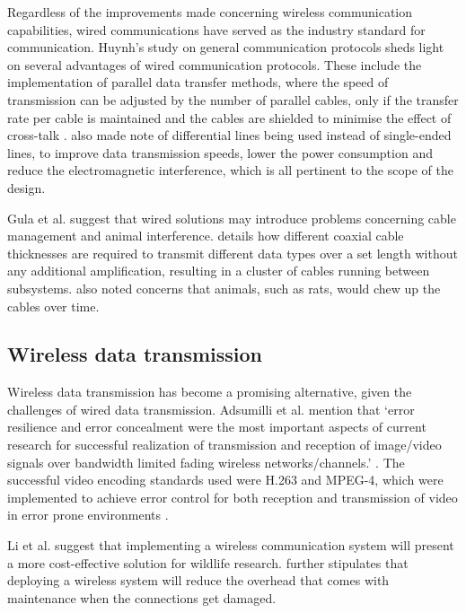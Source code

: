 Regardless of the improvements made concerning wireless communication capabilities, wired communications have served as the industry standard for communication. Huynh’s study on general communication protocols \cite{huynh2010study} sheds light on several advantages of wired communication protocols. These include the implementation of parallel data transfer methods, where the speed of transmission can be adjusted by the number of parallel cables, only if the transfer rate per cable is maintained and the cables are shielded to minimise the effect of cross-talk \cite{huynh2010study}. \cite{huynh2010study} also made note of differential lines being used instead of single-ended lines, to improve data transmission speeds, lower the power consumption and reduce the electromagnetic interference, which is all pertinent to the scope of the design.

Gula et al. \cite{gula2010audio} suggest that wired solutions may introduce problems concerning cable management and animal interference. \cite{gula2010audio} details how different coaxial cable thicknesses are required to transmit different data types over a set length without any additional amplification, resulting in a cluster of cables running between subsystems. \cite{gula2010audio} also noted concerns that animals, such as rats, would chew up the cables over time. 

\subsection{Wireless data transmission}

Wireless data transmission has become a promising alternative, given the challenges of wired data transmission. Adsumilli et al. mention that ‘error resilience and error concealment were the most important aspects of current research for successful realization of transmission and reception of image/video signals over bandwidth limited fading wireless networks/channels.’ \cite{adsumilli2002adaptive}. The successful video encoding standards used were H.263 and MPEG-4, which were implemented to achieve error control for both reception and transmission of video in error prone environments \cite{adsumilli2002adaptive}. 

Li et al. \cite{li2010design} suggest that implementing a wireless communication system will present a more cost-effective solution for wildlife research.  \cite{li2010design} further stipulates that deploying a wireless system will reduce the overhead that comes with maintenance when the connections get damaged.

